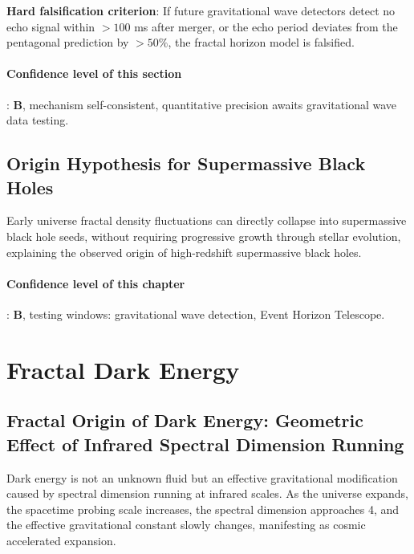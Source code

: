 \documentclass[12pt,a4paper,twocolumn]{article}
\begin{document}
\textbf{Hard falsification criterion}: If future gravitational wave detectors detect no echo signal within $>100$ ms after merger, or the echo period deviates from the pentagonal prediction by $>50\%$, the fractal horizon model is falsified.

\paragraph{Confidence level of this section}: \textbf{B}, mechanism self-consistent, quantitative precision awaits gravitational wave data testing.

\subsection{Origin Hypothesis for Supermassive Black Holes}
Early universe fractal density fluctuations can directly collapse into supermassive black hole seeds, without requiring progressive growth through stellar evolution, explaining the observed origin of high-redshift supermassive black holes.

\paragraph{Confidence level of this chapter}: \textbf{B}, testing windows: gravitational wave detection, Event Horizon Telescope.

\section{Fractal Dark Energy}
\label{sec:dark_energy}

\subsection{Fractal Origin of Dark Energy: Geometric Effect of Infrared Spectral Dimension Running}
Dark energy is not an unknown fluid but an effective gravitational modification caused by spectral dimension running at infrared scales. As the universe expands, the spacetime probing scale increases, the spectral dimension approaches 4, and the effective gravitational constant slowly changes, manifesting as cosmic accelerated expansion.
\end{document}
